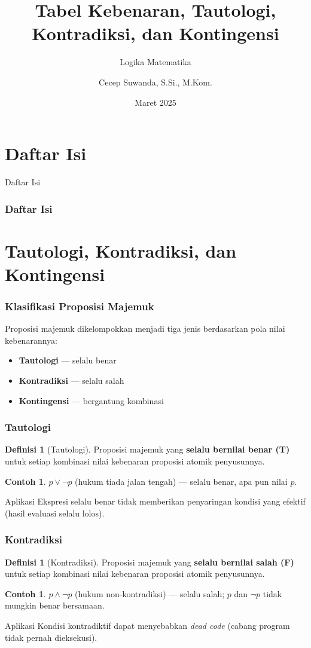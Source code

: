 \documentclass[handout]{beamer}
\subtitle[Logika Matematika]{Logika Matematika}
\title[Tabel Kebenaran, Tautologi, Kontradiksi]{Tabel Kebenaran, Tautologi, Kontradiksi, dan Kontingensi}
\author{Cecep Suwanda, S.Si., M.Kom.}
\date{Maret 2025}
\institute{Universitas Bale Bandung}
\theoremstyle{definition}
\newtheorem{definisi}[theorem]{Definisi}
\theoremstyle{example}
\newtheorem{contoh}[theorem]{Contoh}
\begin{document}
\maketitle

\section*{Daftar Isi}
\begin{frame}{Daftar Isi}
\frametitle{Daftar Isi}
\tableofcontents
\end{frame}

\section{Tautologi, Kontradiksi, dan Kontingensi}

\begin{frame}
\frametitle{Klasifikasi Proposisi Majemuk}
Proposisi majemuk dikelompokkan menjadi tiga jenis berdasarkan pola nilai kebenarannya:
\begin{itemize}
  \item \textbf{Tautologi} --- selalu benar
  \item \textbf{Kontradiksi} --- selalu salah
  \item \textbf{Kontingensi} --- bergantung kombinasi
\end{itemize}
\end{frame}

\begin{frame}
\frametitle{Tautologi}
\begin{definisi}[Tautologi]
Proposisi majemuk yang \textbf{selalu bernilai benar (T)} untuk setiap kombinasi nilai kebenaran proposisi atomik penyusunnya.
\end{definisi}
\begin{contoh}
$p \vee \neg p$ (hukum tiada jalan tengah) --- selalu benar, apa pun nilai $p$.
\end{contoh}
\begin{block}{Aplikasi}
Ekspresi selalu benar tidak memberikan penyaringan kondisi yang efektif (hasil evaluasi selalu lolos).
\end{block}
\end{frame}

\begin{frame}
\frametitle{Kontradiksi}
\begin{definisi}[Kontradiksi]
Proposisi majemuk yang \textbf{selalu bernilai salah (F)} untuk setiap kombinasi nilai kebenaran proposisi atomik penyusunnya.
\end{definisi}
\begin{contoh}
$p \wedge \neg p$ (hukum non-kontradiksi) --- selalu salah; $p$ dan $\neg p$ tidak mungkin benar bersamaan.
\end{contoh}
\begin{block}{Aplikasi}
Kondisi kontradiktif dapat menyebabkan \textit{dead code} (cabang program tidak pernah dieksekusi).
\end{block}
\end{frame}
\end{document}
